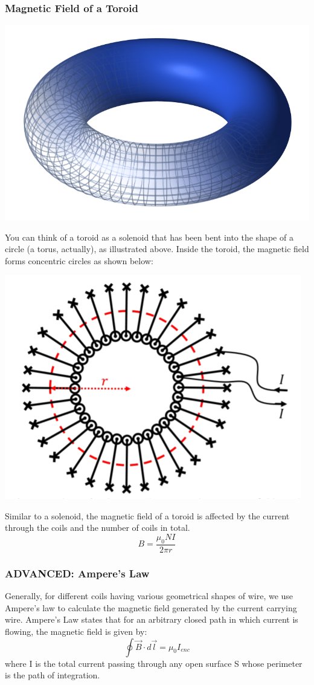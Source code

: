 \documentclass[9pt]{article}
\begin{document}
		\subsubsection*{Magnetic Field of a Toroid}
		\begin{center}
			\includegraphics[scale=0.3]{toroid}
		\end{center}	
		You can think of a toroid as a solenoid that has been bent into the shape of a circle (a torus, actually), as illustrated above.
		Inside the toroid, the magnetic field forms concentric circles as shown below:
		\begin{center}
			\includegraphics[scale=0.3]{torus_field}
		\end{center}
		Similar to a solenoid, the magnetic field of a toroid is affected by the current through the coils and the number of coils in total.
		$$B=\frac{\mu_{0}NI}{2\pi r} $$
		\subsubsection*{ADVANCED: Ampere's Law}
		Generally, for different coils having various geometrical shapes of wire, we use Ampere's law to calculate the magnetic field generated by the current carrying wire. Ampere's Law states that for an arbitrary closed path in which current is flowing, the magnetic field is given by:
		$$\oint \vec{B} \cdot d\vec{l} = \mu_0 I_{enc}$$
		where I is the total current passing through any open surface S whose perimeter is the path of integration. 
		
		
\end{document}
